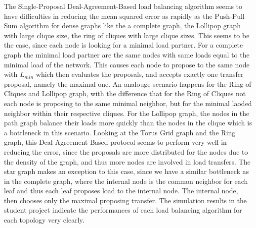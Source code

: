 The Single-Proposal Deal-Agreement-Based load balancing algorithm seems to have difficulties in reducing the mean squared error as rapidly as the Push-Pull Sum algorithm for dense graphs like the a complete graph, the Lollipop graph with large clique size, the ring of cliques with large clique sizes. This seems to be the case, since each node is looking for a minimal load partner. For a complete graph the minimal load partner are the same nodes with same loads equal to the minimal load of the network. This causes each node to propose to the same node with $L_{min}$ which then evaluates the proposals, and accepts exactly one transfer proposal, namely the maximal one. An analouge scenario happens for the Ring of Cliques and Lollipop graph, with the difference that for the Ring of Cliques not each node is proposing to the same minimal neighbor, but for the minimal laoded neighbor within their respective cliques. For the Lollipop graph, the nodes in the path graph balance their loads more quickly than the nodes in the clique which is a bottleneck in this scenario. Looking at the Torus Grid graph and the Ring graph, this Deal-Agreement-Based protocol seems to perform very well in reducing the error, since the proposals are more distributed for the nodes due to the density of the graph, and thus more nodes are involved in load transfers. The star graph makes an exception to this case, since we have a similar bottleneck as in the complete graph, where the internal node is the common neighbor for each leaf and thus each leaf proposes load to the internal node. The internal node, then chooses only the maximal proposing transfer. The simulation results in the student project \cite{Bayazitoglu} indicate the performances of each load balancing algorithm for each topology very clearly.
